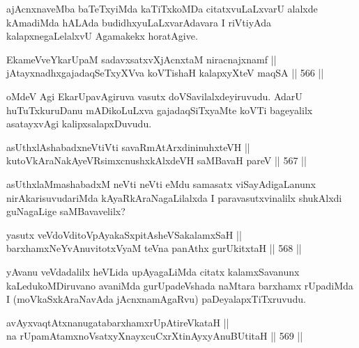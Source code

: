 \begin{artha}
ajAcnxnaveMba baTeTxyiMda kaTiTxkoMDa citatxvuLaLxvarU alalxde
kAmadiMda hALAda budidhxyuLaLxvarAdavara I riVtiyAda
kalapxnegaLelalxvU Agamakekx horatAgive.
\end{artha}

\begin{shl}
EkameVveYkarUpaM sadavxsatxvXjAcnxtaM niracnajxnamf || \\
jAtayxnadhxgajadaqSeTxyXVva koVTishaH kalapxyXteV maqSA \hfill || 566 ||  
\end{shl}

\begin{artha}
oMdeV Agi EkarUpavAgiruva vasutx doVSavilalxdeyiruvudu. AdarU
huTuTxkuruDanu mADikoLuLxva gajadaqSiTxyaMte koVTi bageyalilx
asatayxvAgi kalipxsalapxDuvudu.
\end{artha}


\begin{shl}
asUthxlAshabadxneVtiVti savaRmAtArxdininuhxteVH || \\
kutoV\s kAraNakAyeVR\s simxcnushxkAlxdeVH saMBavaH pareV \hfill || 567 ||  
\end{shl}

\begin{artha}
asUthxlaMmashabadxM neVti neVti eMdu samasatx viSayAdigaLanunx
nirAkarisuvudariMda kAyaRkAraNagaLilalxda I paravasutxvinalilx
shukAlxdi guNagaLige saMBavavelilx?
\end{artha}


\begin{shl}
yasutx veVdoVditoVpAyakaSxpitAsheVSakalamxSaH || \\
barxhamxNeYvAnuvitotxV\s yaM teVna panAthx gurUkitxtaH \hfill || 568 ||  
\end{shl}

\begin{artha}
yAvanu veVdadalilx heVLida upAyagaLiMda citatx kalamxSavanunx
kaLedukoMDiruvano avaniMda gurUpadeVshada naMtara barxhamx rUpadiMda
I (moVkaSxkAraNavAda jAcnxnamAgaRvu) paDeyalapxTiTxruvudu.
\end{artha}

\begin{shl}
avAyxvaqtAtxnanugatabarxhamxrUpAtireVkataH || \\
na rUpamAtamxnoV\s satxyXnayxcuCxrXtinAyxyAnuBUtitaH \hfill || 569 ||  
\end{shl}

